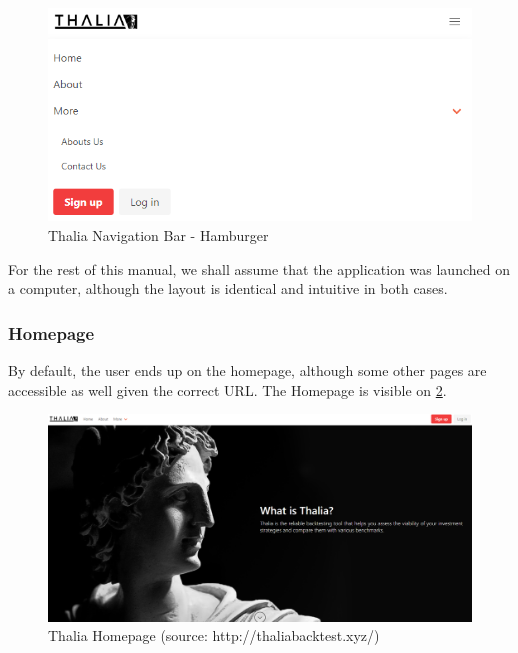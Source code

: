 \documentclass[main.tex]{subfiles}
\begin{document}
\begin{figure}[H]

   \centering

   \includegraphics[width=\textwidth]{08Appendices/081User/081Pictures/navbar_hamburger.png}

   \caption{Thalia Navigation Bar - Hamburger}

   \label{thalia_navbar_hamburger}

\end{figure}



For the rest of this manual, we shall assume that the application was launched on a computer, although the layout is identical and intuitive in both cases. 



\subsubsection{Homepage}



By default, the user ends up on the homepage, although some other pages are accessible as well given the correct URL. The Homepage is visible on \figurename{\ref{thalia_home}}.



\begin{figure}[H]

   \centering

   \includegraphics[width=\textwidth]{08Appendices/081User/081Pictures/homepage.png}

   \caption{Thalia Homepage (source: http://thaliabacktest.xyz/)}

   \label{thalia_home}

\end{figure}
\end{document}
